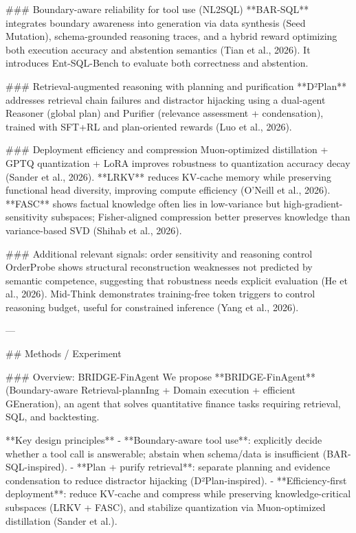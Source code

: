 ### Boundary-aware reliability for tool use (NL2SQL)  
**BAR-SQL** integrates boundary awareness into generation via data synthesis (Seed Mutation), schema-grounded reasoning traces, and a hybrid reward optimizing both execution accuracy and abstention semantics (Tian et al., 2026). It introduces Ent-SQL-Bench to evaluate both correctness and abstention.

### Retrieval-augmented reasoning with planning and purification  
**D²Plan** addresses retrieval chain failures and distractor hijacking using a dual-agent Reasoner (global plan) and Purifier (relevance assessment + condensation), trained with SFT+RL and plan-oriented rewards (Luo et al., 2026).

### Deployment efficiency and compression  
Muon-optimized distillation + GPTQ quantization + LoRA improves robustness to quantization accuracy decay (Sander et al., 2026). **LRKV** reduces KV-cache memory while preserving functional head diversity, improving compute efficiency (O’Neill et al., 2026). **FASC** shows factual knowledge often lies in low-variance but high-gradient-sensitivity subspaces; Fisher-aligned compression better preserves knowledge than variance-based SVD (Shihab et al., 2026).  

### Additional relevant signals: order sensitivity and reasoning control  
OrderProbe shows structural reconstruction weaknesses not predicted by semantic competence, suggesting that robustness needs explicit evaluation (He et al., 2026). Mid-Think demonstrates training-free token triggers to control reasoning budget, useful for constrained inference (Yang et al., 2026).

---

## Methods / Experiment  

### Overview: BRIDGE-FinAgent  
We propose **BRIDGE-FinAgent** (Boundary-aware Retrieval-plannIng + Domain execution + efficient GEneration), an agent that solves quantitative finance tasks requiring retrieval, SQL, and backtesting.

**Key design principles**  
- **Boundary-aware tool use**: explicitly decide whether a tool call is answerable; abstain when schema/data is insufficient (BAR-SQL-inspired).  
- **Plan + purify retrieval**: separate planning and evidence condensation to reduce distractor hijacking (D²Plan-inspired).  
- **Efficiency-first deployment**: reduce KV-cache and compress while preserving knowledge-critical subspaces (LRKV + FASC), and stabilize quantization via Muon-optimized distillation (Sander et al.).

